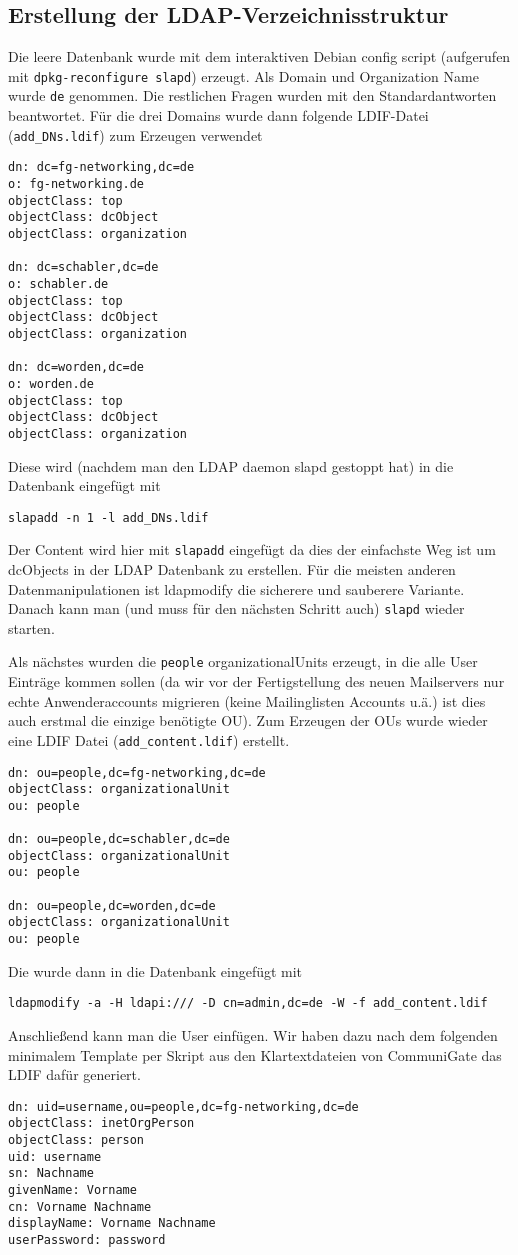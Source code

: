 \subsection{Erstellung der LDAP-Verzeichnisstruktur}\label{sec:Erstelle-DB}
Die leere Datenbank wurde mit dem interaktiven Debian config script (aufgerufen mit \texttt{dpkg-reconfigure slapd}) erzeugt. Als Domain und Organization Name wurde \texttt{de} genommen. Die restlichen Fragen wurden mit den Standardantworten beantwortet. Für die drei Domains wurde dann folgende LDIF-Datei (\texttt{add\_DNs.ldif}) zum Erzeugen verwendet
\begin{lstlisting}
dn: dc=fg-networking,dc=de
o: fg-networking.de
objectClass: top
objectClass: dcObject
objectClass: organization

dn: dc=schabler,dc=de
o: schabler.de
objectClass: top
objectClass: dcObject
objectClass: organization

dn: dc=worden,dc=de
o: worden.de
objectClass: top
objectClass: dcObject
objectClass: organization

\end{lstlisting}
Diese wird (nachdem man den LDAP daemon slapd gestoppt hat) in die Datenbank eingefügt mit
\begin{lstlisting}
slapadd -n 1 -l add_DNs.ldif
\end{lstlisting}
Der Content wird hier mit \texttt{slapadd} eingefügt da dies der einfachste Weg ist um dcObjects in der LDAP Datenbank zu erstellen. Für die meisten anderen Datenmanipulationen ist ldapmodify die sicherere und sauberere Variante. Danach kann man (und muss für den nächsten Schritt auch) \texttt{slapd} wieder starten.

Als nächstes wurden die \texttt{people} organizationalUnits erzeugt, in die alle User Einträge kommen sollen (da wir vor der Fertigstellung des neuen Mailservers nur echte Anwenderaccounts migrieren (keine Mailinglisten Accounts u.ä.) ist dies auch erstmal die einzige benötigte OU). Zum Erzeugen der OUs wurde wieder eine LDIF Datei (\texttt{add\_content.ldif}) erstellt.
\begin{lstlisting}
dn: ou=people,dc=fg-networking,dc=de
objectClass: organizationalUnit
ou: people

dn: ou=people,dc=schabler,dc=de
objectClass: organizationalUnit
ou: people

dn: ou=people,dc=worden,dc=de
objectClass: organizationalUnit
ou: people
\end{lstlisting}
Die wurde dann in die Datenbank eingefügt mit
\begin{lstlisting}
ldapmodify -a -H ldapi:/// -D cn=admin,dc=de -W -f add_content.ldif
\end{lstlisting}
Anschließend kann man die User einfügen. Wir haben dazu nach dem folgenden minimalem Template per Skript aus den Klartextdateien von CommuniGate das LDIF dafür generiert.
\begin{lstlisting}
dn: uid=username,ou=people,dc=fg-networking,dc=de
objectClass: inetOrgPerson
objectClass: person
uid: username
sn: Nachname
givenName: Vorname
cn: Vorname Nachname
displayName: Vorname Nachname
userPassword: password
\end{lstlisting}


